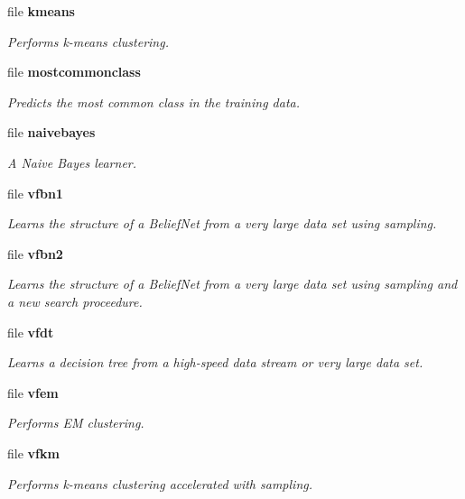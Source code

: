 \begin{CompactItemize}
\item 
file {\bf kmeans}
\begin{CompactList}\small\item\em Performs k-means clustering. \item\end{CompactList}

\item 
file {\bf mostcommonclass}
\begin{CompactList}\small\item\em Predicts the most common class in the training data. \item\end{CompactList}

\item 
file {\bf naivebayes}
\begin{CompactList}\small\item\em A Naive Bayes learner. \item\end{CompactList}

\item 
file {\bf vfbn1}
\begin{CompactList}\small\item\em Learns the structure of a Belief\-Net from a very large data set using sampling. \item\end{CompactList}

\item 
file {\bf vfbn2}
\begin{CompactList}\small\item\em Learns the structure of a Belief\-Net from a very large data set using sampling and a new search proceedure. \item\end{CompactList}

\item 
file {\bf vfdt}
\begin{CompactList}\small\item\em Learns a decision tree from a high-speed data stream or very large data set. \item\end{CompactList}

\item 
file {\bf vfem}
\begin{CompactList}\small\item\em Performs EM clustering. \item\end{CompactList}

\item 
file {\bf vfkm}
\begin{CompactList}\small\item\em Performs k-means clustering accelerated with sampling. \item\end{CompactList}

\end{CompactItemize}

